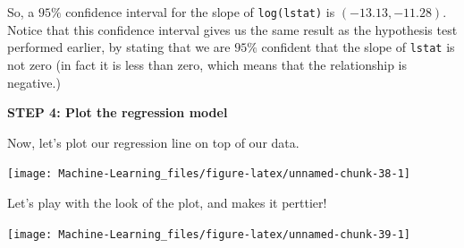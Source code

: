 \documentclass[]{book}
\newenvironment{Shaded}{\begin{snugshade}}{\end{snugshade}}
\newcommand{\KeywordTok}[1]{\textcolor[rgb]{0.13,0.29,0.53}{\textbf{#1}}}
\newcommand{\DataTypeTok}[1]{\textcolor[rgb]{0.13,0.29,0.53}{#1}}
\newcommand{\DecValTok}[1]{\textcolor[rgb]{0.00,0.00,0.81}{#1}}
\newcommand{\StringTok}[1]{\textcolor[rgb]{0.31,0.60,0.02}{#1}}
\newcommand{\CommentTok}[1]{\textcolor[rgb]{0.56,0.35,0.01}{\textit{#1}}}
\newcommand{\OperatorTok}[1]{\textcolor[rgb]{0.81,0.36,0.00}{\textbf{#1}}}
\newcommand{\NormalTok}[1]{#1}
\begin{document}
So, a \(95\%\) confidence interval for the slope of \texttt{log(lstat)}
is \((-13.13, -11.28)\). Notice that this confidence interval gives us
the same result as the hypothesis test performed earlier, by stating
that we are \(95\%\) confident that the slope of \texttt{lstat} is not
zero (in fact it is less than zero, which means that the relationship is
negative.)

\textbf{STEP 4: Plot the regression model}

Now, let's plot our regression line on top of our data.

\begin{Shaded}
\end{Shaded}

\begin{center}\texttt{[image: Machine-Learning\_files/figure-latex/unnamed-chunk-38-1]} \end{center}

Let's play with the look of the plot, and makes it perttier!

\begin{Shaded}
\end{Shaded}

\begin{center}\texttt{[image: Machine-Learning\_files/figure-latex/unnamed-chunk-39-1]} \end{center}
\end{document}
